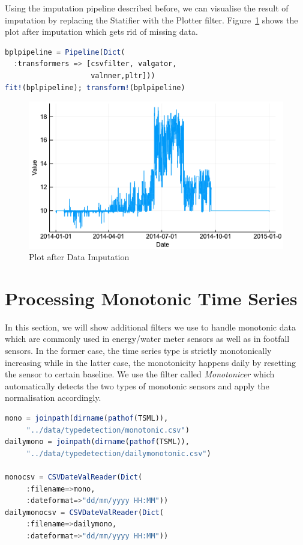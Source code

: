 \documentclass{juliacon}
\begin{document}
Using the imputation pipeline described before, we can visualise the result of imputation by replacing the Statifier with the Plotter filter. Figure~\ref{fig:amplot} shows the plot after imputation which gets rid of missing data.

\begin{lstlisting}[language = Julia]
bplpipeline = Pipeline(Dict(
  :transformers => [csvfilter, valgator, 
                    valnner,pltr]))
fit!(bplpipeline); transform!(bplpipeline)
\end{lstlisting}

\begin{figure}[htbp]
   \centering
   \includegraphics[width=\columnwidth]{amplot.png} %
   \caption{Plot after Data Imputation}
   \label{fig:amplot}
\end{figure}

\section{Processing Monotonic Time Series}
In this section, we will show additional filters we use to handle monotonic data which are commonly used in energy/water meter sensors as well as in footfall sensors. In the former case, the time series type is strictly monotonically increasing while in the latter case, the monotonicity happens daily by resetting the sensor to certain baseline. We use the filter called \emph{Monotonicer} which automatically detects the two types of monotonic sensors and apply the normalisation accordingly. 

\begin{lstlisting}[language = Julia]
mono = joinpath(dirname(pathof(TSML)),
     "../data/typedetection/monotonic.csv")
dailymono = joinpath(dirname(pathof(TSML)),
     "../data/typedetection/dailymonotonic.csv")
 
monocsv = CSVDateValReader(Dict(
     :filename=>mono,
     :dateformat=>"dd/mm/yyyy HH:MM"))
dailymonocsv = CSVDateValReader(Dict(
     :filename=>dailymono,
     :dateformat=>"dd/mm/yyyy HH:MM"))
\end{lstlisting}
\end{document}
